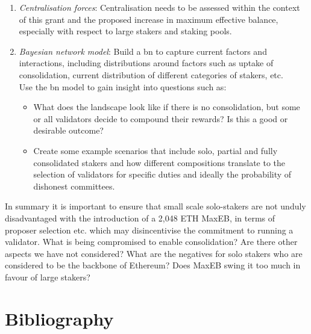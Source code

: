 \documentclass[UTF8]{article}
\begin{document}
\begin{enumerate}
\item \textit{Centralisation forces}: 
Centralisation needs to be assessed within the context of this grant and the proposed increase in maximum effective balance, especially with respect to large stakers and staking pools.

\item \textit{Bayesian network model}: Build a \gls{bn} to capture current factors and interactions, including distributions around factors such as uptake of consolidation, current distribution of different categories of stakers, etc. \\
Use the \gls{bn} model to gain insight into questions such as:
	\begin{itemize}
	\item What does the landscape look like if there is no consolidation, but some or all validators decide to compound their rewards? Is this a good or desirable outcome? 
	\item Create some example scenarios that include solo, partial and fully consolidated stakers and how different compositions translate to the selection of validators for specific duties and ideally the probability of dishonest committees.
	\end{itemize}
 
\end{enumerate}

In summary it is important to ensure that small scale solo-stakers are not unduly disadvantaged with the introduction of a 2,048 ETH MaxEB, in terms of proposer selection etc. which may disincentivise the commitment to running a validator. What is being compromised to enable consolidation? Are there other aspects we have not considered? What are the negatives for solo stakers who are considered to be the backbone of Ethereum? Does MaxEB swing it too much in favour of large stakers?












\section{Bibliography}
\nocite{*}


\end{document}
